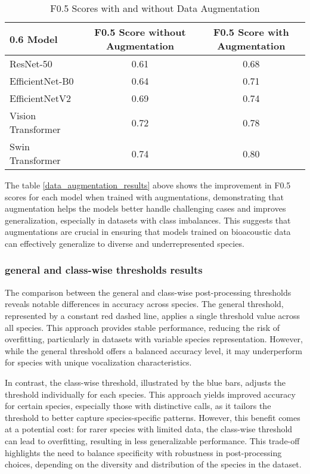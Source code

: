 \begin{table}[h]  
\begin{tabular}{|l|c|c|}{0.6\textwidth} 
\hline 
\textbf{Model} & \textbf{F0.5 Score without Augmentation} & \textbf{F0.5 Score with Augmentation} \\
\hline 
ResNet-50 & 0.61 & 0.68 \\
EfficientNet-B0 & 0.64 & 0.71 \\
EfficientNetV2 & 0.69 & 0.74 \\
Vision Transformer & 0.72 & 0.78 \\
Swin Transformer & 0.74 & 0.80 \\
\hline 
\end{tabular} 
\caption{F0.5 Scores with and without Data Augmentation} 
\label{tab:data_augmentation_results}
\end{table}

The table \ref{data_augmentation_results} above shows the improvement in F0.5 scores for each model when trained with augmentations, demonstrating that augmentation helps the models better handle challenging cases and improves generalization, especially in datasets with class imbalances. This suggests that augmentations are crucial in ensuring that models trained on bioacoustic data can effectively generalize to diverse and underrepresented species.

\subsubsection{general and class-wise thresholds results}

The comparison between the general and class-wise post-processing thresholds reveals notable differences in accuracy across species. The general threshold, represented by a constant red dashed line, applies a single threshold value across all species. This approach provides stable performance, reducing the risk of overfitting, particularly in datasets with variable species representation. However, while the general threshold offers a balanced accuracy level, it may underperform for species with unique vocalization characteristics.

In contrast, the class-wise threshold, illustrated by the blue bars, adjusts the threshold individually for each species. This approach yields improved accuracy for certain species, especially those with distinctive calls, as it tailors the threshold to better capture species-specific patterns. However, this benefit comes at a potential cost: for rarer species with limited data, the class-wise threshold can lead to overfitting, resulting in less generalizable performance. This trade-off highlights the need to balance specificity with robustness in post-processing choices, depending on the diversity and distribution of the species in the dataset.

